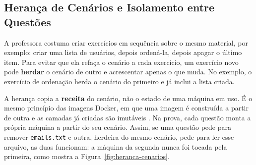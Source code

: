 \subsection{Herança de Cenários e Isolamento entre Questões}
\label{sec:heranca-cenarios}

A professora costuma criar exercícios em sequência sobre o mesmo material, por exemplo: criar uma lista de usuários, depois ordená-la, depois apagar o último item. Para evitar que ela refaça o cenário a cada exercício, um exercício novo pode \textbf{herdar} o cenário de outro e acrescentar apenas o que muda. No exemplo, o exercício de ordenação herda o cenário do primeiro e já inclui a lista criada.

A herança copia a \textbf{receita} do cenário, não o estado de uma máquina em uso. É o mesmo princípio das imagens Docker, em que uma imagem é construída a partir de outra e as camadas já criadas são imutáveis \cite{docker2026layers}. Na prova, cada questão monta a própria máquina a partir do seu cenário. Assim, se uma questão pede para remover \texttt{emails.txt} e outra, herdeira do mesmo cenário, pede para ler esse arquivo, as duas funcionam: a máquina da segunda nunca foi tocada pela primeira, como mostra a Figura~\ref{fig:heranca-cenarios}.

